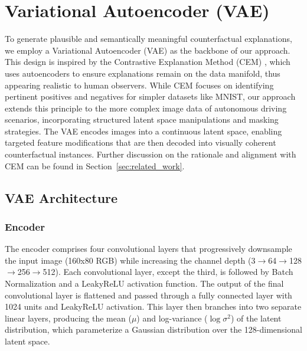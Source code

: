 \section{Variational Autoencoder (VAE)} \label{sec:vae}

To generate plausible and semantically meaningful counterfactual explanations, we employ a Variational Autoencoder (VAE) as the backbone of our approach. This design is inspired by the Contrastive Explanation Method (CEM) \cite{DBLP:journals/corr/abs-1802-07623}, which uses autoencoders to ensure explanations remain on the data manifold, thus appearing realistic to human observers. While CEM focuses on identifying pertinent positives and negatives for simpler datasets like MNIST, our approach extends this principle to the more complex image data of autonomous driving scenarios, incorporating structured latent space manipulations and masking strategies. The VAE encodes images into a continuous latent space, enabling targeted feature modifications that are then decoded into visually coherent counterfactual instances.  Further discussion on the rationale and alignment with CEM can be found in Section~\ref{sec:related_work}.

\subsection{VAE Architecture}  \label{sec:vae_architecture}




\subsubsection{Encoder} \label{subsec:encoder}
The encoder comprises four convolutional layers that progressively downsample the input image (160x80 RGB) while increasing the channel depth (3$\to$64$\to$128$\to$256$\to$512).  Each convolutional layer, except the third, is followed by Batch Normalization and a LeakyReLU activation function. The output of the final convolutional layer is flattened and passed through a fully connected layer with 1024 units and LeakyReLU activation. This layer then branches into two separate linear layers, producing the mean ($\mu$) and log-variance ($\log \sigma^2$) of the latent distribution, which parameterize a Gaussian distribution over the 128-dimensional latent space.


